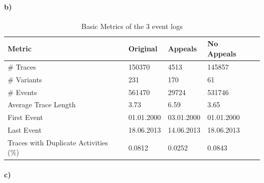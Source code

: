 \documentclass[12pt]{report}
\begin{document}
\paragraph{\textbf{b)}}

\begin{table}[H]
\centering
\begin{tabular}{|l|l|l|l|l|}
	\hline \textbf{Metric} & \textbf{Original} & \textbf{Appeals} & \textbf{No Appeals} \\
	\hline \# Traces & 150370 & 4513 & 145857\\
	\hline \# Variants & 231 & 170 &61\\
	\hline \# Events & 561470 & 29724 & 531746\\
	\hline Average Trace Length & 3.73 & 6.59 & 3.65\\
	\hline First Event & 01.01.2000 & 03.01.2000 & 01.01.2000\\
	\hline Last Event & 18.06.2013 & 14.06.2013 & 18.06.2013\\
	\hline Traces with Duplicate Activities (\%)  & 0.0812 & 0.0252 & 0.0843\\
	\hline
\end{tabular}
\caption{Basic Metrics of the 3 event logs}
\label{tab:1b}
\end{table}

\paragraph{\textbf{c)}}
\end{document}
